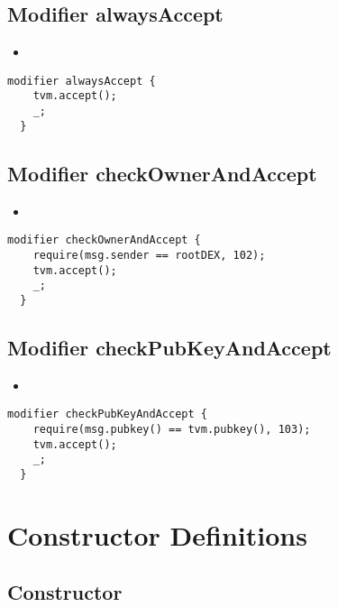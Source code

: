 \subsection{Modifier alwaysAccept}

\begin{itemize}
\item {}
\end{itemize}

\begin{lstlisting}[firstnumber=71]
  modifier alwaysAccept {
    tvm.accept();
    _;
  }
\end{lstlisting}

\subsection{Modifier checkOwnerAndAccept}

\begin{itemize}
\item \issueError{}
\end{itemize}

\begin{lstlisting}[firstnumber=76]
  modifier checkOwnerAndAccept {
    require(msg.sender == rootDEX, 102);
    tvm.accept();
    _;
  }
\end{lstlisting}

\subsection{Modifier checkPubKeyAndAccept}

\begin{itemize}
\item \issueError{}
\end{itemize}

\begin{lstlisting}[firstnumber=82]
  modifier checkPubKeyAndAccept {
    require(msg.pubkey() == tvm.pubkey(), 103);
    tvm.accept();
    _;
  }
\end{lstlisting}

\section{Constructor Definitions}


\subsection{Constructor}

